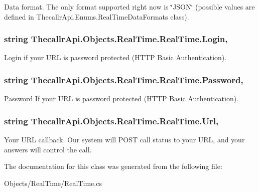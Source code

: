 Data format. The only format supported right now is \char`\"{}\+J\+S\+O\+N\char`\"{} (possible values are defined in Thecallr\+Api.\+Enums.\+Real\+Time\+Data\+Formats class). 

\hypertarget{class_thecallr_api_1_1_objects_1_1_real_time_1_1_real_time_a7f00ac41d231c5d758a5294cd7a2777c}{
\subsubsection[{Login}]{\setlength{\rightskip}{0pt plus 5cm}string Thecallr\+Api.\+Objects.\+Real\+Time.\+Real\+Time.\+Login\hspace{0.3cm}{\ttfamily [get]}, {\ttfamily [set]}}}\label{class_thecallr_api_1_1_objects_1_1_real_time_1_1_real_time_a7f00ac41d231c5d758a5294cd7a2777c}


Login if your U\+R\+L is password protected (H\+T\+T\+P Basic Authentication). 

\hypertarget{class_thecallr_api_1_1_objects_1_1_real_time_1_1_real_time_a6a97a4668e19618e11cef48eb86e5f65}{
\subsubsection[{Password}]{\setlength{\rightskip}{0pt plus 5cm}string Thecallr\+Api.\+Objects.\+Real\+Time.\+Real\+Time.\+Password\hspace{0.3cm}{\ttfamily [get]}, {\ttfamily [set]}}}\label{class_thecallr_api_1_1_objects_1_1_real_time_1_1_real_time_a6a97a4668e19618e11cef48eb86e5f65}


Password If your U\+R\+L is password protected (H\+T\+T\+P Basic Authentication). 

\hypertarget{class_thecallr_api_1_1_objects_1_1_real_time_1_1_real_time_a33ab53bd6843893ad4fda5488e94b16d}{
\subsubsection[{Url}]{\setlength{\rightskip}{0pt plus 5cm}string Thecallr\+Api.\+Objects.\+Real\+Time.\+Real\+Time.\+Url\hspace{0.3cm}{\ttfamily [get]}, {\ttfamily [set]}}}\label{class_thecallr_api_1_1_objects_1_1_real_time_1_1_real_time_a33ab53bd6843893ad4fda5488e94b16d}


Your U\+R\+L callback. Our system will P\+O\+S\+T call status to your U\+R\+L, and your answers will control the call. 



The documentation for this class was generated from the following file\+:\begin{DoxyCompactItemize}
\item 
Objects/\+Real\+Time/Real\+Time.\+cs\end{DoxyCompactItemize}
